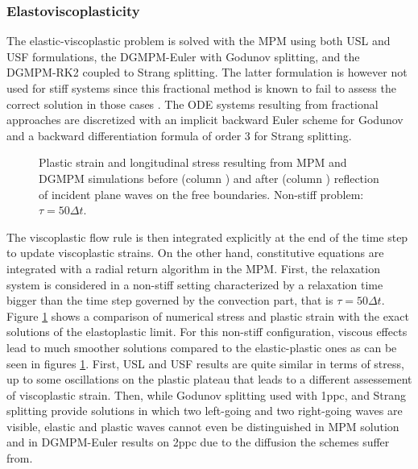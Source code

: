 \subsubsection{Elastoviscoplasticity}
The elastic-viscoplastic problem is solved with the MPM using both USL and USF formulations, the DGMPM-Euler with Godunov splitting, and the DGMPM-RK2 coupled to Strang splitting.
The latter formulation is however not used for stiff systems since this fractional method is known to fail to assess the correct solution in those cases \cite{Thomas_EVP,Leveque_stiff}.
The ODE systems resulting from fractional approaches are discretized with an implicit backward Euler scheme for Godunov and a backward differentiation formula of order 3 for Strang splitting.
\begin{figure}[h!]
  \centering
  { \label{subfig:evp_nonstiff1}}
  { \label{subfig:evp_nonstiff3}}
  {}
  \caption{Plastic strain and longitudinal stress resulting from MPM and DGMPM simulations before (column ) and after (column ) reflection of incident plane waves on the free boundaries. Non-stiff problem: $\tau=50\Delta t$.}
  \label{fig:nonstiff_elastoviscoplastic_RP}
\end{figure}
The viscoplastic flow rule is then integrated explicitly at the end of the time step to update viscoplastic strains.
On the other hand, constitutive equations are integrated with a radial return algorithm \cite{Simo} in the MPM.
First, the relaxation system is considered in a non-stiff setting characterized by a relaxation time bigger than the time step governed by the convection part, that is $\tau=50\Delta t$.
Figure \ref{fig:nonstiff_elastoviscoplastic_RP} shows a comparison of numerical stress and plastic strain with the exact solutions of the elastoplastic limit.
For this non-stiff configuration, viscous effects lead to much smoother solutions compared to the elastic-plastic ones as can be seen in figures \ref{fig:nonstiff_elastoviscoplastic_RP}.
First, USL and USF results are quite similar in terms of stress, up to some oscillations on the plastic plateau that leads to a different assessement of viscoplastic strain. 
Then, while Godunov splitting used with 1ppc, and Strang splitting provide solutions in which two left-going and two right-going waves are visible, elastic and plastic waves cannot even be distinguished in MPM solution and in DGMPM-Euler results on 2ppc due to the diffusion the schemes suffer from.
